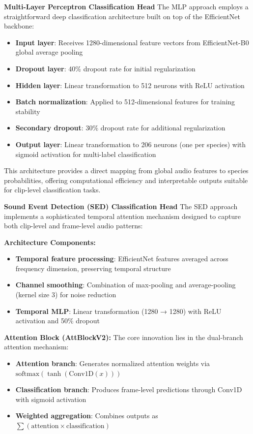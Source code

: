 \documentclass[ERTS, 2025]{ERTS}
\begin{document}
\textbf{Multi-Layer Perceptron Classification Head}
The MLP approach employs a straightforward deep classification architecture built on top of the EfficientNet backbone:

\begin{itemize}
    \item \textbf{Input layer}: Receives 1280-dimensional feature vectors from EfficientNet-B0 global average pooling
    \item \textbf{Dropout layer}: 40\% dropout rate for initial regularization
    \item \textbf{Hidden layer}: Linear transformation to 512 neurons with ReLU activation
    \item \textbf{Batch normalization}: Applied to 512-dimensional features for training stability
    \item \textbf{Secondary dropout}: 30\% dropout rate for additional regularization
    \item \textbf{Output layer}: Linear transformation to 206 neurons (one per species) with sigmoid activation for multi-label classification
\end{itemize}

This architecture provides a direct mapping from global audio features to species probabilities, offering computational efficiency and interpretable outputs suitable for clip-level classification tasks.

\textbf{Sound Event Detection (SED) Classification Head}
The SED approach implements a sophisticated temporal attention mechanism designed to capture both clip-level and frame-level audio patterns:

\textbf{Architecture Components:}
\begin{itemize}
    \item \textbf{Temporal feature processing}: EfficientNet features averaged across frequency dimension, preserving temporal structure
    \item \textbf{Channel smoothing}: Combination of max-pooling and average-pooling (kernel size 3) for noise reduction
    \item \textbf{Temporal MLP}: Linear transformation (1280 → 1280) with ReLU activation and 50\% dropout
\end{itemize}

\textbf{Attention Block (AttBlockV2):}
The core innovation lies in the dual-branch attention mechanism:
\begin{itemize}
    \item \textbf{Attention branch}: Generates normalized attention weights via $\text{softmax}(\tanh(\text{Conv1D}(x)))$
    \item \textbf{Classification branch}: Produces frame-level predictions through Conv1D with sigmoid activation
    \item \textbf{Weighted aggregation}: Combines outputs as $\sum(\text{attention} \times \text{classification})$
\end{itemize}
\end{document}
